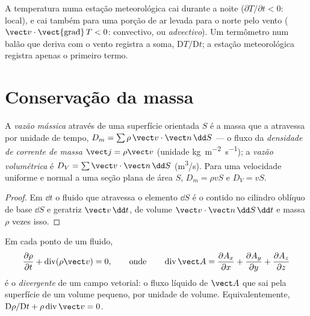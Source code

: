 \begin{example}\label{ex:b2:fluid-kinematics:weather}
A temperatura numa estação meteorológica cai durante a noite ($\partial T/
\partial t < 0$: local), e cai também para uma porção de ar levada para o norte
pelo vento ($\vect v\cdot\operatorname{\vect{grad}}T < 0$: convectivo, ou
\emph{advectivo}). Um termômetro num balão que deriva com o vento
registra a soma, $\mathrm DT/\mathrm Dt$; a estação meteorológica registra apenas
o primeiro termo.
\end{example}

\section{Conservação da massa}

\begin{definition}\label{def:b2:fluid-kinematics:flowrate}
A \emph{vazão mássica} através de uma superfície orientada $S$ é a massa
que a atravessa por unidade de tempo, $D_m = \sum\rho\,\vect v\cdot\vect n\,\dd S$ ---
o fluxo da \emph{densidade de corrente de massa} $\vect j = \rho\vect v$ (unidade
\unit{kg.m^{-2}.s^{-1}}); a \emph{vazão volumétrica} é $D_V = \sum\vect v
\cdot\vect n\,\dd S$ (\unit{m^3/s}). Para uma velocidade uniforme e normal a uma seção
plana de área $S$, $D_m = \rho vS$ e $D_V = vS$.
\end{definition}

\begin{proof}
Em $\dd t$ o fluido que atravessa o elemento $\dd S$ é o contido no
cilindro oblíquo de base $\dd S$ e geratriz $\vect v\,\dd t$, de
volume $\vect v\cdot\vect n\,\dd S\,\dd t$ e massa $\rho$ vezes isso.
\end{proof}

\begin{theorem}\label{thm:b2:fluid-kinematics:continuity}
Em cada ponto de um fluido,
\[
\frac{\partial\rho}{\partial t} + \operatorname{div}(\rho\vect v) = 0 ,
\qquad\text{onde}\qquad
\operatorname{div}\vect A = \frac{\partial A_x}{\partial x} + \frac{\partial A_y}{\partial y} +
\frac{\partial A_z}{\partial z}
\]
é o \emph{divergente} de um campo vetorial: o fluxo líquido de
$\vect A$ que sai pela superfície de um volume pequeno, por unidade de volume.
Equivalentemente, $\mathrm D\rho/\mathrm Dt + \rho\operatorname{div}\vect v = 0$.
\end{theorem}

